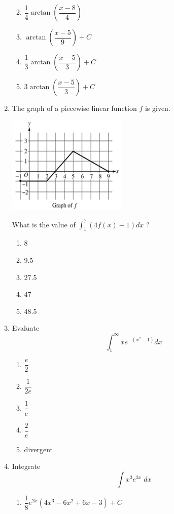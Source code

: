 \documentclass[12pt
]{article}
\providecommand{\tightlist}{%
  \setlength{\itemsep}{0pt}\setlength{\parskip}{0pt}}
\def\tightlist{}
\begin{document}
\begin{enumerate}
  \begin{enumerate}
  \def\labelenumii{\alph{enumii}.}
  \tightlist
  \item
    \(\dfrac{1}{4} \arctan \left( \dfrac {x-8}{4} \right)\)
  \item
    \(\arctan\left( \dfrac{x - 5}{9} \right) + C\)
  \item
    \(\dfrac{1}{3}\arctan\left( \dfrac{x - 5}{3} \right) + C\)
  \item
    \(3\arctan\left( \dfrac{x - 5}{3} \right) + C\)
  \end{enumerate}
\item
  The graph of a piecewise linear function \(f\) is given.

  \includegraphics[width=2.23958in,height=1.84375in]{media/image1.png}

  What is the value of
  \(\displaystyle \int_{1}^{7}\left( 4f(x) - 1 \right)dx\) ?

  \begin{enumerate}
  \def\labelenumii{\alph{enumii}.}
  \tightlist
  \item
    8
  \item
    9.5
  \item
    27.5
  \item
    47
  \item
    48.5
  \end{enumerate}
\item
  Evaluate \[\displaystyle \int_{1}^{\infty}xe^{-(x^{2}-1)}dx\]

  \begin{enumerate}
  \def\labelenumii{\alph{enumii}.}
  \tightlist
  \item
    \(\dfrac{e}{2}\)
  \item
    \(\dfrac{1}{2e}\)
  \item
    \(\dfrac{1}{e}\)
  \item
    \(\dfrac{2}{e}\)
  \item
    divergent
  \end{enumerate}
\item
  Integrate \[\int x^3 e^{2x} \; dx\]

  \begin{enumerate}
  \def\labelenumii{\alph{enumii}.}
  \tightlist
  \item
    \(\dfrac{1}{8} e^{2 x} \left(4 x^3-6 x^2+6 x-3\right) + C\)
  \end{enumerate}
\end{enumerate}
\end{document}
